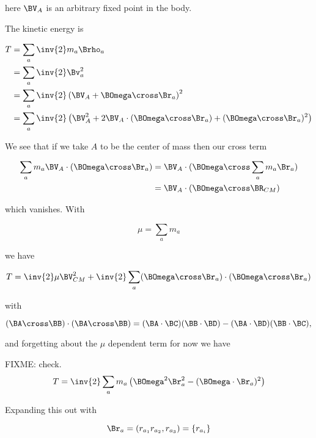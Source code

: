 here $\BV_A$ is an arbitrary fixed point in the body.

The kinetic energy is

\begin{align*}
T 
&= \sum_a \inv{2} m_a \Brho_a \\
&= \sum_a \inv{2} \Bv_a^2 \\
&= 
\sum_a \inv{2} \left(
\BV_A + \BOmega \cross \Br_a
\right)^2 \\
&=
\sum_a \inv{2} \left( \BV_A^2 +
2 \BV_A \cdot (\BOmega \cross \Br_a)
+ (\BOmega \cross \Br_a)^2
\right)
\end{align*}

We see that if we take $A$ to be the center of mass then our cross term

\begin{align*}
\sum_a m_a \BV_A \cdot (\BOmega \cross \Br_a)
&=
\BV_A \cdot (\BOmega \cross \sum_a m_a \Br_a) \\
&=
\BV_A \cdot (\BOmega \cross \BR_{CM} )
\end{align*}

which vanishes.  With 

\begin{equation}\label{eqn:rigidBodyMotion:380}
\mu = \sum_a m_a
\end{equation}

we have

\begin{equation}\label{eqn:rigidBodyMotion:400}
T = \inv{2} \mu \BV_{CM}^2+ \inv{2} \sum_a 
(\BOmega \cross \Br_a) \cdot (\BOmega \cross \Br_a) 
\end{equation}

with

\begin{equation}\label{eqn:rigidBodyMotion:420}
(\BA \cross \BB) \cdot (\BA \cross \BB)
=
(\BA \cdot \BC) (\BB \cdot \BD)
-(\BA \cdot \BD) (\BB \cdot \BC),
\end{equation}

and forgetting about the $\mu$ dependent term for now we have

FIXME: check.
\begin{equation}\label{eqn:rigidBodyMotion:440}
T = \inv{2} \sum_a m_a \left( \BOmega^2 \Br_a^2 - (\BOmega \cdot \Br_a)^2
\right)
\end{equation}

Expanding this out with 

\begin{equation}\label{eqn:rigidBodyMotion:460}
\Br_a = ( r_{a_1} r_{a_2}, r_{a_3} ) = \{ r_{a_i} \}
\end{equation}

